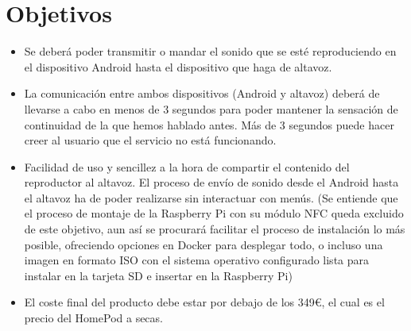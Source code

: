 \section{Objetivos}
\begin{itemize}
    \item Se deberá poder transmitir o mandar el sonido que se esté
    reproduciendo en el dispositivo Android hasta el dispositivo que haga de
    altavoz.
    \item La comunicación entre ambos dispositivos (Android y altavoz) deberá de
    llevarse a cabo en menos de 3 segundos para poder mantener la sensación de
    continuidad de la que hemos hablado antes. Más de 3 segundos puede hacer
    creer al usuario que el servicio no está funcionando.
    \item Facilidad de uso y sencillez a la hora de compartir el contenido del
    reproductor al altavoz. El proceso de envío de sonido desde el Android hasta
    el altavoz ha de poder realizarse sin interactuar con menús. (Se entiende
    que el proceso de montaje de la Raspberry Pi con su módulo NFC queda
    excluido de este objetivo, aun así se procurará facilitar el proceso de
    instalación lo más posible, ofreciendo opciones en Docker para desplegar
    todo, o incluso una imagen en formato ISO con el sistema operativo
    configurado lista para instalar en la tarjeta SD e insertar en la Raspberry
    Pi)
    \item El coste final del producto debe estar por debajo de los 349€, el cual
    es el precio del HomePod a secas.
\end{itemize}

